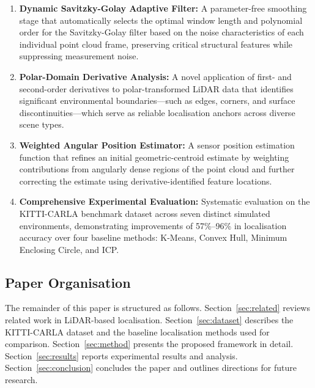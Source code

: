 \documentclass[lettersize,journal]{IEEEtran}
\begin{document}
\begin{enumerate}
  \item \textbf{Dynamic Savitzky-Golay Adaptive Filter:} A parameter-free smoothing
    stage that automatically selects the optimal window length and polynomial order for
    the Savitzky-Golay filter \cite{savitzky1964smoothing} based on the noise
    characteristics of each individual point cloud frame, preserving critical structural
    features while suppressing measurement noise.

  \item \textbf{Polar-Domain Derivative Analysis:} A novel application of first- and
    second-order derivatives to polar-transformed LiDAR data that identifies
    significant environmental boundaries---such as edges, corners, and surface
    discontinuities---which serve as reliable localisation anchors across diverse
    scene types.

  \item \textbf{Weighted Angular Position Estimator:} A sensor position estimation
    function that refines an initial geometric-centroid estimate by weighting
    contributions from angularly dense regions of the point cloud and further
    correcting the estimate using derivative-identified feature locations.

  \item \textbf{Comprehensive Experimental Evaluation:} Systematic evaluation on the
    KITTI-CARLA benchmark dataset across seven distinct simulated environments,
    demonstrating improvements of 57\%--96\% in localisation accuracy over four
    baseline methods: K-Means, Convex Hull, Minimum Enclosing Circle, and ICP.
\end{enumerate}

\subsection{Paper Organisation}

The remainder of this paper is structured as follows. Section~\ref{sec:related}
reviews related work in LiDAR-based localisation. Section~\ref{sec:dataset}
describes the KITTI-CARLA dataset and the baseline localisation methods used for
comparison. Section~\ref{sec:method} presents the proposed framework in detail.
Section~\ref{sec:results} reports experimental results and analysis.
Section~\ref{sec:conclusion} concludes the paper and outlines directions for future
research.

\end{document}
